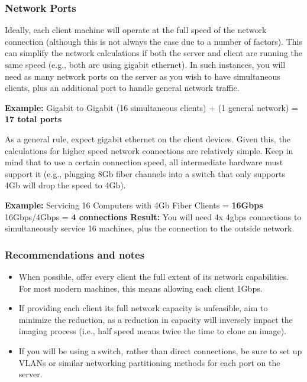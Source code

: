 \documentclass{article}
\begin{document}
\begin{flushleft}
\subsubsection{Network Ports}
Ideally, each client machine will operate at the full speed of the network connection (although this is not always the case due to a number of factors).  This can simplify the network calculations if both the server and client are running the same speed (e.g., both are using gigabit ethernet).  In such instances, you will need as many network ports on the server as you wish to have simultaneous clients, plus an additional port to handle general network traffic.
\begin{center}
  \textbf{Example:} Gigabit to Gigabit\linebreak
  (16 simultaneous clients) + (1 general network) = \textbf{17 total ports}
\end{center}
As a general rule, expect gigabit ethernet on the client devices.  Given this, the calculations for higher speed network connections are relatively simple.  Keep in mind that to use a certain connection speed, all intermediate hardware must support it (e.g., plugging 8Gb fiber channels into a switch that only supports 4Gb will drop the speed to 4Gb).
\begin{center}
  \textbf{Example:} Servicing 16 Computers with 4Gb Fiber Clients = \textbf{16Gbps}\linebreak
  16Gbps/4Gbps = \textbf{4 connections}\linebreak
  \textbf{Result:} You will need 4x 4gbps connections to simultaneously service 16 machines, plus the connection to the outside network.
\end{center}
\subsubsection{Recommendations and notes}
\begin{itemize}
  \item When possible, offer every client the full extent of its network capabilities.  For most modern machines, this means allowing each client 1Gbps.
  \item If providing each client its full network capacity is unfeasible, aim to minimize the reduction, as a reduction in capacity will inversely impact the imaging process (i.e., half speed means twice the time to clone an image).
  \item If you will be using a switch, rather than direct connections, be sure to set up VLANs or similar networking partitioning methods for each port on the server.
\end{itemize}


\end{flushleft}
\end{document}
